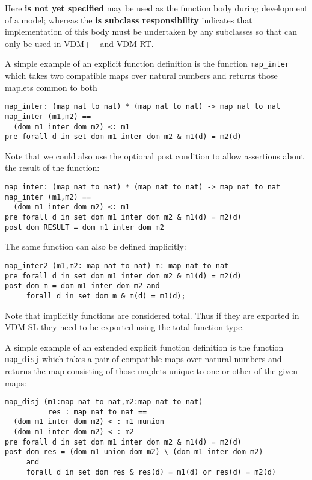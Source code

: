 \documentclass{overturerepchap}
\newcommand{\keyw}[1]{{\bf\ttfamily #1}}
\begin{document}
Here \keyw{is not yet specified} may be used as the function body
during development of a model; whereas the \keyw{is subclass
  responsibility} indicates that implementation of this body must be
undertaken by any subclasses so that can only be used in VDM++ and
VDM-RT.

A simple example of an explicit function definition is the function
\texttt{map\_inter} which takes two compatible maps over natural
numbers and returns those maplets common to both
\begin{lstlisting}
map_inter: (map nat to nat) * (map nat to nat) -> map nat to nat
map_inter (m1,m2) ==
  (dom m1 inter dom m2) <: m1
pre forall d in set dom m1 inter dom m2 & m1(d) = m2(d)
\end{lstlisting}
Note that we could also use the optional post condition to allow
assertions about the result of the function:
\begin{lstlisting}
map_inter: (map nat to nat) * (map nat to nat) -> map nat to nat
map_inter (m1,m2) ==
  (dom m1 inter dom m2) <: m1
pre forall d in set dom m1 inter dom m2 & m1(d) = m2(d)
post dom RESULT = dom m1 inter dom m2
\end{lstlisting}

The same function can also be defined implicitly:
\begin{lstlisting}
map_inter2 (m1,m2: map nat to nat) m: map nat to nat
pre forall d in set dom m1 inter dom m2 & m1(d) = m2(d)
post dom m = dom m1 inter dom m2 and
     forall d in set dom m & m(d) = m1(d);
\end{lstlisting}
\noindent Note that implicitly functions are considered total. Thus if they are exported in VDM-SL they need to be exported using the total function type.
 
A simple example of an extended explicit function definition
is the function \texttt{map\_disj} which takes a pair of
compatible maps over natural numbers and returns the map consisting of
those maplets unique to one or other of the given maps:

\begin{lstlisting}
map_disj (m1:map nat to nat,m2:map nat to nat)
          res : map nat to nat ==
  (dom m1 inter dom m2) <-: m1 munion
  (dom m1 inter dom m2) <-: m2
pre forall d in set dom m1 inter dom m2 & m1(d) = m2(d)
post dom res = (dom m1 union dom m2) \ (dom m1 inter dom m2)
     and
     forall d in set dom res & res(d) = m1(d) or res(d) = m2(d)
\end{lstlisting}
\label{mapdisj}
\end{document}
